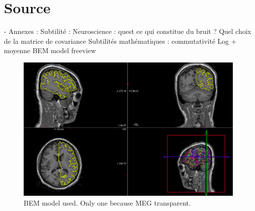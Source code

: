 \chapter{Source}

- Annexes : Subtilité :
Neuroscience : quest ce qui constitue du bruit ? Quel choix de la matrice de covariance
Subtilités mathématiques :  commutativité Log + moyenne
BEM model freeview



\begin{figure}[ht]
    \centering
    \includegraphics[width=15cm]{images_report/source/BEM_model_freeview_cropped.png}
    \caption[Segemntentation results visualized on Freeview.]%
    {BEM model used. Only one because MEG transparent.}
    \label{BEM_model_freeview_cropped}
\end{figure}
